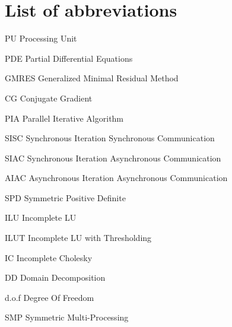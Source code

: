 \makeatletter
\newcommand{\tocfill}{\cleaders\hbox{$\m@th \mkern\@dotsep mu . \mkern\@dotsep mu$}\hfill}
\makeatother
\newcommand{\abbrlabel}[1]{\makebox[3cm][l]{\textbf{#1}\ \tocfill}}
\newenvironment{abbreviations}{\begin{list}{}{\renewcommand{\makelabel}{\abbrlabel}%
\setlength{\itemsep}{0pt}}}{\end{list}}

\chapter*{List of abbreviations}


\begin{abbreviations}
\item[PU] Processing Unit
\item[PDE] Partial Differential Equations
\item[GMRES] Generalized Minimal Residual Method
\item[CG] Conjugate Gradient
\item[PIA] Parallel Iterative Algorithm
\item[SISC] Synchronous Iteration Synchronous Communication
\item[SIAC] Synchronous Iteration Asynchronous Communication
\item[AIAC] Asynchronous Iteration Asynchronous Communication
\item[SPD] Symmetric Positive Definite
\item[ILU] Incomplete LU
\item[ILUT] Incomplete LU with Thresholding
\item[IC] Incomplete Cholesky
\item[DD] Domain Decomposition
\item[d.o.f] Degree Of Freedom
\item[SMP] Symmetric Multi-Processing
\end{abbreviations}

